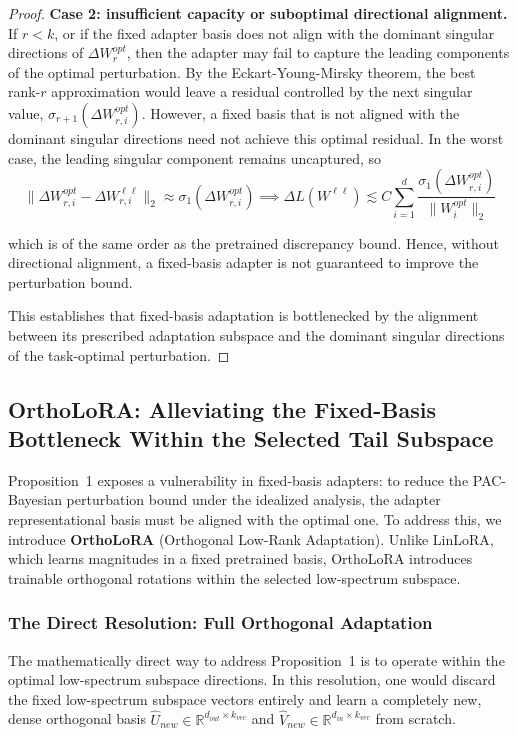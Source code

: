 \documentclass{article}
\begin{document}
\begin{proof}
\textbf{Case 2: insufficient capacity or suboptimal directional alignment.} If $r < k$, or if the fixed adapter basis does not align with the dominant singular directions of $\Delta W_r^{opt}$, then the adapter may fail to capture the leading components of the optimal perturbation. By the Eckart-Young-Mirsky theorem, the best rank-$r$ approximation would leave a residual controlled by the next singular value, $\sigma_{r+1}(\Delta W_{r,i}^{opt})$. However, a fixed basis that is not aligned with the dominant singular directions need not achieve this optimal residual. In the worst case, the leading singular component remains uncaptured, so
\[
\|\Delta W_{r,i}^{opt} - \Delta W_{r,i}^{\ell \ell}\|_2
\approx
\sigma_1(\Delta W_{r,i}^{opt})
\implies
\Delta L(W^{\ell \ell})
\lesssim
C
\sum_{i=1}^{d}
\frac{\sigma_1(\Delta W_{r,i}^{opt})}{\|W_i^{opt}\|_2}
\]

which is of the same order as the pretrained discrepancy bound. Hence, without directional alignment, a fixed-basis adapter is not guaranteed to improve the perturbation bound.

This establishes that fixed-basis adaptation is bottlenecked by the alignment between its prescribed adaptation subspace and the dominant singular directions of the task-optimal perturbation.
\end{proof}

\subsection{OrthoLoRA: Alleviating the Fixed-Basis Bottleneck Within the Selected Tail Subspace}\label{sec}

Proposition~1 exposes a vulnerability in fixed-basis adapters: to reduce the PAC-Bayesian perturbation bound under the idealized analysis, the adapter representational basis must be aligned with the optimal one. To address this, we introduce \textbf{OrthoLoRA} (Orthogonal Low-Rank Adaptation). Unlike LinLoRA, which learns magnitudes in a fixed pretrained basis, OrthoLoRA introduces trainable orthogonal rotations within the selected low-spectrum subspace.

\subsubsection{The Direct Resolution: Full Orthogonal Adaptation}

The mathematically direct way to address Proposition~1 is to operate within the optimal low-spectrum subspace directions. In this resolution, one would discard the fixed low-spectrum subspace vectors entirely and learn a completely new, dense orthogonal basis $\hat{U}_{new} \in \mathbb{R}^{d_{out} \times k_{vec}}$ and $\hat{V}_{new} \in \mathbb{R}^{d_{in} \times k_{vec}}$ from scratch.
\end{document}
